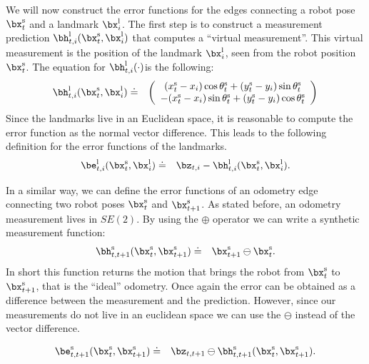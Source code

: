 \documentclass[a4paper]{article}
\begin{document}
We will now construct the error functions for the edges connecting a
robot pose $\bx^\mathrm{s}_t$ and a landmark $\bx^\mathrm{l}_i$.  The
first step is to construct a measurement prediction
$\bh^\mathrm{l}_{t,i}(\bx^\mathrm{s}_t, \bx^\mathrm{l}_i)$ that computes
a ``virtual measurement''. This virtual measurement is the position of
the landmark $\bx^\mathrm{l}_i$, seen from the robot position
$\bx^\mathrm{s}_t$. The equation for $\bh^\mathrm{l}_{t,i}(\cdot)$is the
following:
\begin{eqnarray}
    \bh^\mathrm{l}_{t,i}(\bx^\mathrm{s}_t, \bx^\mathrm{l}_i)   & \doteq & 
    \left( 
    \begin{array}{c}
        (x^\mathrm{s}_t - x_i)  \cos \theta^\mathrm{s}_t + (y^\mathrm{s}_t - y_i) \sin \theta^\mathrm{s}_t \\
      - (x^\mathrm{s}_t - x_i)  \sin \theta^\mathrm{s}_t + (y^\mathrm{s}_t - y_i) \cos \theta^\mathrm{s}_t 
    \end{array}
    \right)
\end{eqnarray}
Since the landmarks live in an Euclidean space, it is reasonable to
compute the error function as the normal vector difference.  This
leads to the following definition for the error functions of the
landmarks.
\begin{eqnarray}
    \be^\mathrm{l}_{t,i}(\bx^\mathrm{s}_t, \bx^\mathrm{l}_i)   & \doteq & \bz_{t,i} - \bh^\mathrm{l}_{t,i}(\bx^\mathrm{s}_t, \bx^\mathrm{l}_i).
    \label{eq:landmarkError}
\end{eqnarray}

In a similar way, we can define the error functions of an odometry
edge connecting two robot poses $\bx^\mathrm{s}_t$ and
$\bx^\mathrm{s}_{t+1}$. As stated before, an odometry measurement lives in $SE(2)$.
By using the $\oplus$ operator we can write a synthetic measurement function:
\begin{eqnarray}
    \bh^\mathrm{s}_{t,t+1}(\bx^\mathrm{s}_t, \bx^\mathrm{s}_{t+1})   & \doteq & \bx^\mathrm{s}_{t+1} \ominus \bx^\mathrm{s}_{t}.
\end{eqnarray}
In short this function returns the motion that brings the robot from
$\bx^\mathrm{s}_t$ to $\bx^\mathrm{s}_{t+1}$, that is the ``ideal''
odometry.  Once again the error can be obtained as a difference
between the measurement and the prediction. However, since our measurements
do not live in an euclidean space we can use the $\ominus$ instead of the vector difference.

\begin{eqnarray}
    \be^\mathrm{s}_{t,t+1}(\bx^\mathrm{s}_t, \bx^\mathrm{s}_{t+1})   & \doteq & \bz_{t,t+1} \ominus \bh^\mathrm{s}_{t,t+1}(\bx^\mathrm{s}_t, \bx^\mathrm{s}_{t+1}).
    \label{eq:odometryError}
\end{eqnarray}
\end{document}
